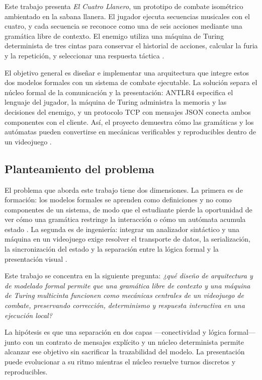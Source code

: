 \documentclass[9pt]{ieeeconf}
\begin{document}
Este trabajo presenta \emph{El Cuatro Llanero}, un prototipo de combate isométrico ambientado en la sabana llanera. El jugador ejecuta secuencias musicales con el cuatro, y cada secuencia se reconoce como una de seis acciones mediante una gramática libre de contexto. El enemigo utiliza una máquina de Turing determinista de tres cintas para conservar el historial de acciones, calcular la furia y la repetición, y seleccionar una respuesta táctica \cite{hopcroft2006,sipser2012}.

El objetivo general es diseñar e implementar una arquitectura que integre estos dos modelos formales con un sistema de combate ejecutable. La solución separa el núcleo formal de la comunicación y la presentación: ANTLR4 especifica el lenguaje del jugador, la máquina de Turing administra la memoria y las decisiones del enemigo, y un protocolo TCP con mensajes JSON conecta ambos componentes con el cliente. Así, el proyecto demuestra cómo las gramáticas y los autómatas pueden convertirse en mecánicas verificables y reproducibles dentro de un videojuego \cite{gregory2018,nystrom2014}.

\subsection{Planteamiento del problema}
\label{sec:problema}

El problema que aborda este trabajo tiene dos dimensiones. La primera es de formación: los modelos formales se aprenden como definiciones y no como componentes de un sistema, de modo que el estudiante pierde la oportunidad de ver cómo una gramática restringe la interacción o cómo un autómata acumula estado \cite{gee2003,scott2015}. La segunda es de ingeniería: integrar un analizador sintáctico y una máquina en un videojuego exige resolver el transporte de datos, la serialización, la sincronización del estado y la separación entre la lógica formal y la presentación visual \cite{gregory2018,nystrom2014}.

Este trabajo se concentra en la siguiente pregunta: \emph{¿qué diseño de arquitectura y de modelado formal permite que una gramática libre de contexto y una máquina de Turing multicinta funcionen como mecánicas centrales de un videojuego de combate, preservando corrección, determinismo y respuesta interactiva en una ejecución local?}

La hipótesis es que una separación en dos capas ---conectividad y lógica formal--- junto con un contrato de mensajes explícito y un núcleo determinista permite alcanzar ese objetivo sin sacrificar la trazabilidad del modelo. La presentación puede evolucionar a su ritmo mientras el núcleo resuelve turnos discretos y reproducibles.
\end{document}
